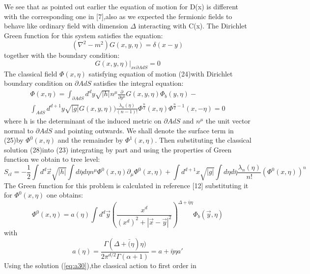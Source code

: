 \documentclass[a4paper,12pt]{article}
\begin{document}
 We see that as pointed out earlier the equation of motion for
 D(x) is different with the corresponding one in [7],also as we
 expected the fermionic fields to behave like ordinary field with
 dimension $\Delta$ interacting with C(x).
 The Dirichlet Green function for this system satisfies the
 equation:
   \begin{equation}
   (\nabla^{2}-m^{2})G(x,y,\eta)=\delta(x-y)
   \end{equation}
 together with the boundary condition:
 \begin{equation}
 G(x,y,\eta)|_{x\epsilon\partial AdS}=0
 \end{equation}
 The classical field $\Phi(x,\eta)$ satisfying equation of motion
 (24)with Dirichlet boundary condition on $\partial AdS$ satisfies
  the integral equation:
 \begin{eqnarray}
 \Phi(x,\eta)=\int_{\partial AdS}d^{d}y\sqrt{|h|}n^{\mu}\frac{\partial}{\partial
 y^{\mu}}G(x,y,\eta)\Phi_{b}(y,\eta)-\nonumber\\
 \int_{AdS}d^{d+1}y\sqrt{|g|}G(x,y,\eta))\frac{\lambda_{n}(\eta)}{(n-1)!}\Phi^{\frac{n}{2}}(x,\eta)\Phi^{\frac{n}{2}-1}(x,-\eta)=0
\end{eqnarray}
 where h is the determinant of the induced metric on $\partial AdS$
 and $n^{\mu}$ the unit vector normal to $\partial AdS$ and
 pointing outwards.
 We shall denote the surface term in (25)by $\Phi^{0}(x,\eta)$ and
 the remainder by $\Phi^{1}(x,\eta)$. Then substituting the
 classical solution (28)into (23) integrating by part and using
 the properties of Green function we obtain to tree level:
 \begin{equation}
 S_{cl}=-\frac{1}{2}\int d^{d}\vec{x}\sqrt{|h|}\int d\bar{\eta}d\eta n^{\mu}\Phi^{0}(x,\eta)
 \partial_{\mu}\Phi^{0}(x,\eta)+\int d^{d+1}x\sqrt{|g|}\int d\eta
 d\bar{\eta}\frac{\lambda_{n}(\eta)}
 {n!}(\Phi^{0}(x,\eta))^{n}
 \end{equation}
 The Green function for this problem is calculated in reference
 [12] substituting it for $\Phi^{0}(x,\eta)$ one obtains:
   \begin{equation}
\Phi^{0}(x,\eta)=a(\eta)\int
d^{d}\vec{y}(\frac{x^{d}}{(x^{d})^{2}+|\vec{x}-\vec{y}|^{2}})^{\Delta+\bar{\eta}\eta}\Phi_{b}(\vec{y},\eta)
\label{eq:a30}
\end{equation}
 with
 \begin{equation}
 a(\eta)=\frac{\Gamma(\Delta+\bar(\eta)\eta)}{2\pi^{d/2}\Gamma(\alpha+1)}=a+\bar{\eta}\eta a'
 \end{equation}
 Using the solution (\ref{eq:a30}),the classical action to first order in
\end{document}
